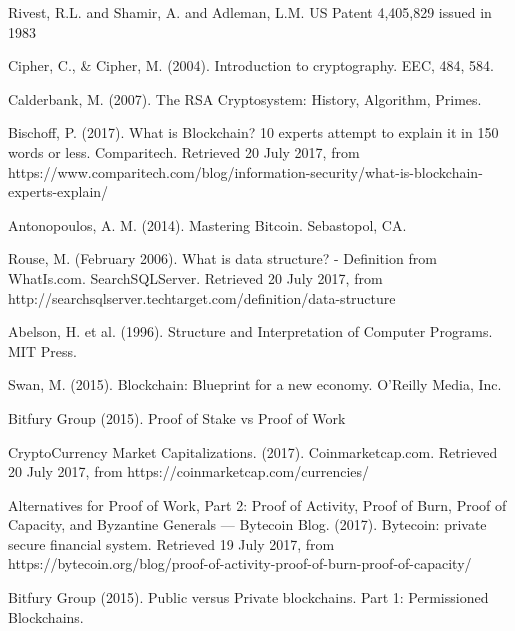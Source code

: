 \begin{thebibliography}{99}




Rivest, R.L. and Shamir, A. and Adleman, L.M. US Patent 4,405,829 issued in 1983

Cipher, C., \& Cipher, M. (2004). Introduction to cryptography. EEC, 484, 584.


Calderbank, M. (2007). The RSA Cryptosystem: History, Algorithm, Primes.


Bischoff, P. (2017). What is Blockchain? 10 experts attempt to explain it in 150 words or less. Comparitech. Retrieved 20 July 2017, from https://www.comparitech.com/blog/information-security/what-is-blockchain-experts-explain/

Antonopoulos, A. M. (2014).
Mastering Bitcoin.
Sebastopol, CA.

Rouse, M. (February 2006). What is data structure? - Definition from WhatIs.com. SearchSQLServer. Retrieved 20 July 2017, from http://searchsqlserver.techtarget.com/definition/data-structure

Abelson, H. et al. (1996).
Structure and Interpretation of Computer Programs.
MIT Press.

Swan, M. (2015). Blockchain: Blueprint for a new economy. O'Reilly Media, Inc.

Bitfury Group (2015). Proof of Stake vs Proof of Work

CryptoCurrency Market Capitalizations. (2017). Coinmarketcap.com. Retrieved 20 July 2017, from https://coinmarketcap.com/currencies/

Alternatives for Proof of Work, Part 2: Proof of Activity, Proof of Burn, Proof of Capacity, and Byzantine Generals — Bytecoin Blog. (2017). Bytecoin: private secure financial system. Retrieved 19 July 2017, from https://bytecoin.org/blog/proof-of-activity-proof-of-burn-proof-of-capacity/

Bitfury Group (2015). Public versus Private blockchains. Part 1: Permissioned Blockchains.


\end{thebibliography}
